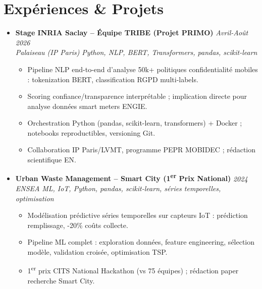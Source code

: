 \documentclass[a4paper,11pt]{article}
\begin{document}
\section{Exp\'eriences \& Projets}
\begin{itemize}[leftmargin=*, label=\tiny$\bullet$, nosep]
    \item \textbf{Stage INRIA Saclay -- \'Equipe TRIBE (Projet PRIMO)} \hfill \textit{Avril-Ao\^ut 2026} \\
    \textit{Palaiseau (IP Paris)} \hfill \textit{Python, NLP, BERT, Transformers, pandas, scikit-learn}
    \vspace{-2pt}
    \begin{itemize}[leftmargin=0.4cm, nosep, label=\tiny$\bullet$]
        \item \small{Pipeline NLP end-to-end d'analyse 50k+ politiques confidentialit\'e mobiles : tokenization BERT, classification RGPD multi-labels.}
        \item \small{Scoring confiance/transparence interpr\'etable ; implication directe pour analyse donn\'ees smart meters ENGIE.}
        \item \small{Orchestration Python (pandas, scikit-learn, transformers) + Docker ; notebooks reproductibles, versioning Git.}
        \item \small{Collaboration IP Paris/LVMT, programme PEPR MOBIDEC ; r\'edaction scientifique EN.}
    \end{itemize}
    \vspace{3pt}

    \item \textbf{Urban Waste Management -- Smart City (1\textsuperscript{er} Prix National)} \hfill \textit{2024} \\
    \textit{ENSEA} \hfill \textit{ML, IoT, Python, pandas, scikit-learn, s\'eries temporelles, optimisation}
    \vspace{-2pt}
    \begin{itemize}[leftmargin=0.4cm, nosep, label=\tiny$\bullet$]
        \item \small{Mod\'elisation pr\'edictive s\'eries temporelles sur capteurs IoT : pr\'ediction remplissage, -20\% co\^uts collecte.}
        \item \small{Pipeline ML complet : exploration donn\'ees, feature engineering, s\'election mod\`ele, validation crois\'ee, optimisation TSP.}
        \item \small{1\textsuperscript{er} prix CITS National Hackathon (vs 75 \'equipes) ; r\'edaction paper recherche Smart City.}
    \end{itemize}
    \vspace{3pt}


\end{itemize}
\end{document}
